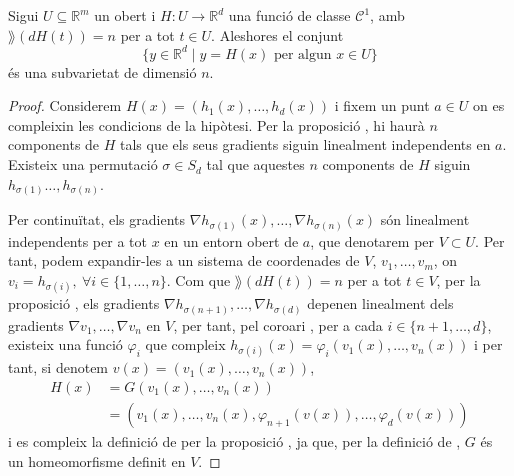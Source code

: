 \documentclass[../Apunts.tex]{subfiles}
\begin{document}
	\begin{theorem}
		\label{thm:Teorema del rang constant}
		Sigui \(U\subseteq\mathbb{R}^{m}\) un obert i \(H\colon U\to\mathbb{R}^{d}\) una funció de classe \(\mathcal{C}^{1}\), amb \(\rang(dH(t))=n\) per a tot \(t\in U\).
		Aleshores el conjunt
		\[\{y\in\mathbb{R}^{d}\mid y=H(x)\text{ per algun }x\in U\}\]
		és una subvarietat de dimensió \(n\).
		\begin{proof}
			Considerem \(H(x)=(h_{1}(x),\dots,h_{d}(x))\) i fixem un punt \(a\in U\) on es compleixin les condicions de la hipòtesi. Per la proposició , hi haurà \(n\) components de \(H\) tals que els seus gradients siguin linealment independents en \(a\). Existeix una permutació \(\sigma\in S_{d}\) tal que aquestes \(n\) components de \(H\) siguin \(h_{\sigma(1)}\dots,h_{\sigma(n)}\).
			
			Per continuïtat, els gradients \(\nabla h_{\sigma(1)}(x),\dots,\nabla h_{\sigma(n)}(x)\) són linealment independents per a tot \(x\) en un entorn obert de \(a\), que denotarem per \(V\subset U\). Per tant, podem expandir-les a un sistema de coordenades de \(V\), \(v_{1},\dots,v_{m}\), on \(v_{i}=h_{\sigma(i)},\ \forall i\in\{1,\dots,n\}\). Com que \(\rang(dH(t))=n\) per a tot \(t\in V\), per la proposició , els gradients \(\nabla h_{\sigma(n+1)},\dots,\nabla h_{\sigma(d)}\) depenen linealment dels gradients \(\nabla v_{1},\dots,\nabla v_{n}\) en \(V\), per tant, pel coro{\lgem}ari , per a cada \(i\in\{n+1,\dots,d\}\), existeix una funció \(\varphi_{i}\) que compleix \(h_{\sigma(i)}(x)=\varphi_{i}(v_{1}(x),\dots,v_{n}(x))\) i per tant, si denotem \(v(x)=(v_{1}(x),\dots,v_{n}(x))\),
			\begin{align*}
			H(x)&=G(v_{1}(x),\dots,v_{n}(x))\\
			&=(v_{1}(x),\dots,v_{n}(x),\varphi_{n+1}(v(x)),\dots,\varphi_{d}(v(x)))
			\end{align*}
			i es compleix la definició de  per la proposició , ja que, per la definició de , \(G\) és un homeomorfisme definit en \(V\). %
		\end{proof}
	\end{theorem}
\end{document}
